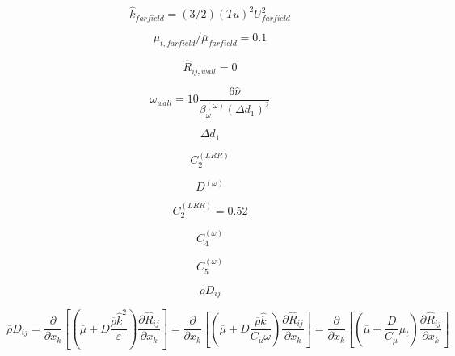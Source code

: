\begin{equation}
\hat k_{farfield} = (3/2) (Tu)^2 U_{farfield}^2
\end{equation}

\begin{equation}
\mu_{t, farfield}/\overline \mu_{farfield} = 0.1
\end{equation}

\begin{equation}
\hat R_{ij, wall} = 0
\end{equation}

\begin{equation}
\omega_{wall} = 10 \frac{6 \hat \nu}{\beta_{\omega}^{(\omega)} (\Delta d_1)^2}
\end{equation}

\begin{equation}
\Delta d_1
\end{equation}

\begin{equation}
C_2^{(LRR)}
\end{equation}

\begin{equation}
D^{(\omega)}
\end{equation}

\begin{equation}
C_2^{(LRR)} = 0.52
\end{equation}

\begin{equation}
C_4^{(\omega)}
\end{equation}

\begin{equation}
C_5^{(\omega)}
\end{equation}

\begin{equation}
\overline \rho D_{ij}
\end{equation}

\begin{equation}
\overline \rho D_{ij} = \frac{\partial}{\partial x_k}
\left[ \left( \overline \mu + D \frac{\overline \rho \hat k^2}{\varepsilon}
\right) \frac{\partial \hat R_{ij}}{\partial x_k} \right]
= \frac{\partial}{\partial x_k}
\left[ \left( \overline \mu + D \frac{\overline \rho \hat k}{C_{\mu} \omega}
\right) \frac{\partial \hat R_{ij}}{\partial x_k} \right]
= \frac{\partial}{\partial x_k}
\left[ \left( \overline \mu + \frac{D}{C_{\mu}} \mu_t
\right) \frac{\partial \hat R_{ij}}{\partial x_k} \right]
\end{equation}

